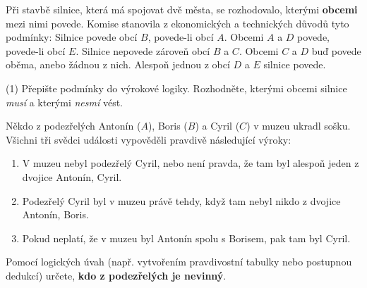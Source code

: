 \documentclass[12pt,a4paper]{article}
\begin{document}
\begin{exercise}
Při stavbě silnice, která má spojovat dvě města, se rozhodovalo, 
kterými \textbf{obcemi} mezi nimi povede. Komise stanovila z 
ekonomických a technických důvodů tyto podmínky:
Silnice povede obcí $B$, povede-li obcí $A$.
Obcemi $A$ a $D$ povede, povede-li obcí $E$.
Silnice nepovede zároveň obcí $B$ a $C$.
Obcemi $C$ a $D$ buď povede oběma, anebo žádnou z nich.
Alespoň jednou z obcí $D$ a $E$ silnice povede.
    \begin{tasks}(1)
        \task Přepište podmínky do výrokové logiky.
        \task Rozhodněte, kterými obcemi silnice \emph{musí} a kterými \emph{nesmí} vést.
    \end{tasks}
\end{exercise}


\begin{exercise}
    Někdo z podezřelých Antonín ($A$), Boris ($B$) a Cyril ($C$) v muzeu ukradl sošku.  
    Všichni tři svědci události vypověděli pravdivě následující výroky:

    \begin{enumerate}[label=\arabic*)]
        \item V muzeu nebyl podezřelý Cyril, nebo není pravda, že tam byl alespoň jeden z dvojice Antonín, Cyril.  
        \item Podezřelý Cyril byl v muzeu právě tehdy, když tam nebyl nikdo z dvojice Antonín, Boris.
        \item Pokud neplatí, že v muzeu byl Antonín spolu s Borisem, pak tam byl Cyril.
    \end{enumerate}

    Pomocí logických úvah (např. vytvořením pravdivostní tabulky nebo postupnou dedukcí) určete,  
    \textbf{kdo z podezřelých je nevinný}.
\end{exercise}
\end{document}
